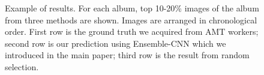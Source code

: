 \documentclass[10pt,twocolumn,letterpaper]{article}
\begin{document}
\begin{figure}[ht]
      \hspace{2em}
       \caption{Example of results. For each album, top 10-20\% images of the album from three methods are shown. Images are arranged in chronological order. First row is the ground truth we acquired from AMT workers; second row is our prediction using Ensemble-CNN which we introduced in the main paper; third row is the result from random selection.}
         \end{figure}
         
\end{document}
